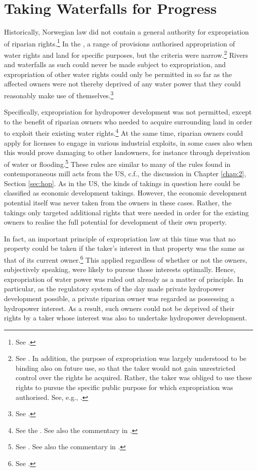\section{Taking Waterfalls for Progress}\label{sec:twp}

Historically, Norwegian law did not contain a general authority for expropriation of riparian rights.\footnote{See \cite[29]{amundsen28}.} In the \cite{wra88}, a range of provisions authorised appropriation of water rights and land for specific purposes, but the criteria were narrow.\footnote{See \cite[69-85]{dahl88}. In addition, the purpose of expropriation was largely understood to be binding also on future use, so that the taker would not gain unrestricted control over the rights he acquired. Rather, the taker was obliged to use these rights to pursue the specific public purpose for which expropriation was authorised. See, e.g., \cite[133-140]{rygh12}.} Rivers and waterfalls as such could never be made subject to expropriation, and expropriation of other water rights could only be permitted in so far as the affected owners were not thereby deprived of any water power that they could reasonably make use of themselves.\footnote{See \cite[58,60]{dahl88}.}

Specifically, expropriation for hydropower development was not permitted, except to the benefit of riparian owners who needed to acquire surrounding land in order to exploit their existing water rights.\footnote{See the \cite[15-16]{wra88}. See also the commentary in \cite[60-65]{dahl88}.} At the same time, riparian owners could apply for licenses to engage in various industrial exploits, in some cases also when this would prove damaging to other landowners, for instance through deprivation of water or flooding.\footnote{See \cite[14]{wra88}. See also the commentary in \cite[54-60]{dahl88}.} These rules are similar to many of the rules found in contemporaneous mill acts from the US, c.f., the discussion in Chapter \ref{chap:2}, Section \ref{sec:hop}. As in the US, the kinds of takings in question here could be classified as economic development takings. However, the economic development potential itself was never taken from the owners in these cases. Rather, the takings only targeted additional rights that were needed in order for the existing owners to realise the full potential for development of their own property.

In fact, an important principle of expropriation law at this time was that no property could be taken if the taker's interest in that property was the same as that of its current owner.\footnote{See \cite[168-170]{dahl88}.} This applied regardless of whether or not the owners, subjectively speaking, were likely to pursue those interests optimally. Hence, expropriation of water power was ruled out already as a matter of principle. In particular, as the regulatory system of the day made private hydropower development possible, a private riparian owner was regarded as possessing a hydropower interest. As a result, such owners could not be deprived of their rights by a taker whose interest was also to undertake hydropower development.

